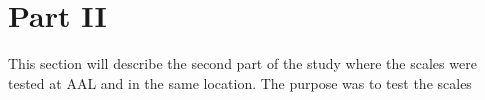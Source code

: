 \section{Part II}
This section will describe the second part of the study where the scales were tested at AAL and in the same location. The purpose was to test the scales 






